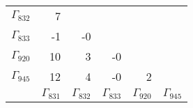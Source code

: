 {\begin{table}
\begin{center}
\begin{minipage}{\linewidth}
\begin{center}
\begin{envsmall}
\begin{center}
\renewcommand*{\arraystretch}{1.1}%
\begin{tabular}{rrrrrr}
\hline
\( \Gamma_{832} \) &    7 &  &  &  &  \\
\( \Gamma_{833} \) &   -1 &   -0 &  &  &  \\
\( \Gamma_{920} \) &   10 &    3 &   -0 &  &  \\
\( \Gamma_{945} \) &   12 &    4 &   -0 &    2 &  \\
 & \( \Gamma_{831} \) & \( \Gamma_{832} \) & \( \Gamma_{833} \) & \( \Gamma_{920} \) & \( \Gamma_{945} \)
\\\hline
\end{tabular}
\end{center}
\end{envsmall}
\ifhevea\else
\end{center}
\end{minipage}
\fi
\end{center}
\ifhevea\end{table}\fi}%
%
%
%
%
%
%
